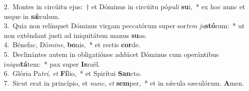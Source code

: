 {2.~}Montes in circúitu ejus:~† et Dóminus in circúitu pó\textit{pu}\textit{li} \textbf{su}i,~* ex hoc nunc et usque in \textbf{sǽ}culum.\\
{3.~}Quia non relínquet Dóminus virgam peccatórum super sor\textit{tem} \textit{ju}\textbf{stó}rum:~* ut non exténdant justi ad iniquitátem manus \textbf{su}as.\\
{4.~}Bénefac, Dó\textit{mi}\textit{ne}, \textbf{bo}nis,~* et rectis \textbf{cor}de.\\
{5.~}Declinántes autem in obligatiónes addúcet Dóminus cum operántibus i\textit{ni}\textit{qui}\textbf{tá}tem:~* pax super \textbf{Is}raël.\\
{6.~}Glória Pa\textit{tri}, \textit{et} \textbf{Fí}lio,~* et Spirítui \textbf{San}cto.\\
{7.~}Sicut erat in princípio, et \textit{nunc}, \textit{et} \textbf{sem}per,~* et in sǽcula sæculórum. \textbf{A}men.\\
